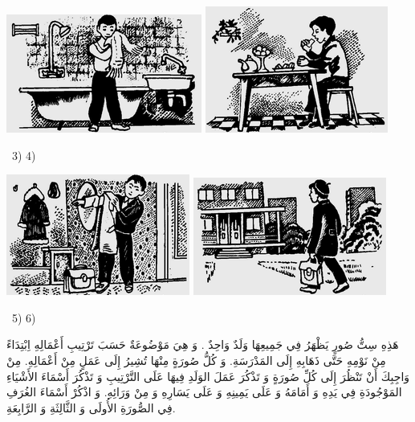 \documentclass[a5paper]{article}
\begin{document}
 \includegraphics[width=2.5311in,height=1.5311in]{MuhammadBagauddinlatinized-img341.png}   \includegraphics[width=2.3646in,height=1.6354in]{MuhammadBagauddinlatinized-img342.png} 

\ 3) 4)

 \includegraphics[width=2.3752in,height=1.5626in]{MuhammadBagauddinlatinized-img343.png}   \includegraphics[width=2.5in,height=1.5209in]{MuhammadBagauddinlatinized-img344.png} 

\ 5) 6)

هَذِهِ سِتُّ صُورٍ يَظْهَرُ فِي جَمِيعِهَا وَلَدٌ وَاحِدٌ . وَ هِيَ مَوْضُوعَةٌ حَسَبَ تَرْتِيبِ أَعْمَالِهِ اِبْتِدَاءً مِنْ نَوْمِهِ حَتَّى ذَهَابِهِ إِلَى المَدْرَسَةِ. وَ كُلُّ صُورَةٍ مِنْهَا تُشِيرُ إِلَى عَمَلٍ مِنْ أَعْمَالِهِ. مِنْ وَاجِبِكَ أَنْ تَنْظُرَ إِلَى كُلِّ صُورَةٍ وَ تَذْكُرَ عَمَلَ الوَلَدِ فِيهَا عَلَى التَّرْتِيبِ وَ تَذْكُرَ أَسْمَاءَ الأَشْيَاءِ المَوْجُودَةِ فِي يَدِهِ وَ أَمَامَهُ وَ عَلَى يَمِينِهِ وَ عَلَى يَسَارِهِ وَ مِنْ وَرَائِهِ. وَ اذْكُرْ أَسْمَاءَ الغُرَفِ فِي الصُّورَةِ الأُولَى وَ الثَّالِثَةِ وَ الرَّابِعَةِ.
\end{document}
